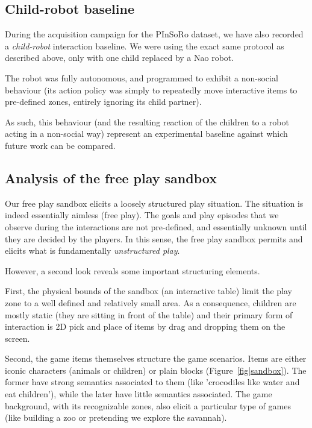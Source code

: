 \documentclass{article}
\begin{document}
\subsection{Child-robot baseline}

During the acquisition campaign for the PInSoRo dataset, we have also recorded a
\emph{child-robot} interaction baseline. We were using the exact same protocol
as described above, only with one child replaced by a Nao robot.

The robot was fully autonomous, and programmed to exhibit a non-social behaviour
(its action policy was simply to repeatedly move interactive items to
pre-defined zones, entirely ignoring its child partner).

As such, this behaviour (and the resulting reaction of the children to a
robot acting in a non-social way) represent an experimental baseline against which
future work can be compared.


\subsection{Analysis of the free play sandbox}

Our free play sandbox elicits a loosely structured play situation. The
situation is indeed essentially aimless (free play). The goals and play episodes
that we observe during the interactions are not pre-defined, and essentially
unknown until they are decided by the players. In this sense, the free play
sandbox permits and elicits what is fundamentally \emph{unstructured play}.

However, a second look reveals some important structuring elements.

First, the physical bounds of the sandbox (an interactive table) limit the
play zone to a well defined and relatively small area. As a consequence,
children are mostly static (they are sitting in front of the table) and their
primary form of interaction is 2D pick and place of items by drag and dropping
them on the screen.

Second, the game items themselves structure the game scenarios. Items are either
iconic characters (animals or children) or plain blocks
(Figure~\ref{fig|sandbox}). The former have strong semantics associated to them
(like 'crocodiles like water and eat children'), while the later have little
semantics associated. The game background, with its recognizable zones, also
elicit a particular type of games (like building a zoo or pretending we explore
the savannah).
\end{document}
